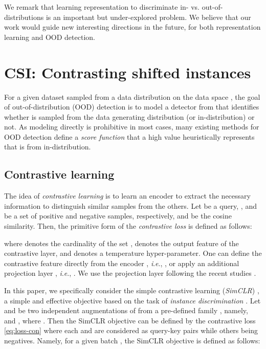 \documentclass{article}
\newcommand{\ie}{\textit{i}.\textit{e}.}
\begin{document}
We remark that learning representation to discriminate in- vs. out-of-distributions is an important but under-explored problem. We believe that our work would guide new interesting directions in the future, for both representation learning and OOD detection.

 \vspace{-0.05in}
\section{CSI: Contrasting shifted instances}
\vspace{-0.05in}
\label{sec:method}

For a given dataset  sampled from a data distribution  on the data space , the goal of out-of-distribution (OOD) detection is to model a detector from  that identifies whether  is sampled from the data generating distribution (or in-distribution)  or not. As modeling  directly is prohibitive in most cases, many existing methods for OOD detection define a \emph{score function}  that a high value heuristically represents that  is from in-distribution.

\vspace{-0.05in}
\subsection{Contrastive learning}
\vspace{-0.05in}
\label{sec:method-prelim}

The idea of \emph{contrastive learning} is to learn an encoder  to extract the necessary information to distinguish similar samples from the others. Let  be a query, , and  be a set of positive and negative samples, respectively, and  be the cosine similarity. Then, the primitive form of the \emph{contrastive loss} is defined as follows:

where  denotes the cardinality of the set ,  denotes the output feature of the contrastive layer, and  denotes a temperature hyper-parameter. One can define the contrastive feature  directly from the encoder , \ie,  \citep{he2019momentum}, or apply an additional projection layer , \ie,  \citep{chen2020simple}. We use the projection layer following the recent studies \citep{chen2020simple,khosla2020supervised}.

In this paper, we specifically consider the simple contrastive learning (\textit{SimCLR}) \citep{chen2020simple}, a simple and effective objective based on the task of \emph{instance discrimination} \citep{wu2018unsupervised}. Let  and  be two independent augmentations of  from a pre-defined family , namely,  and , where . Then the SimCLR objective can be defined by the contrastive loss \eqref{eq:loss-con} where each  and  are considered as query-key pairs while others being negatives. Namely, for a given batch , the SimCLR objective is defined as follows:
\end{document}
